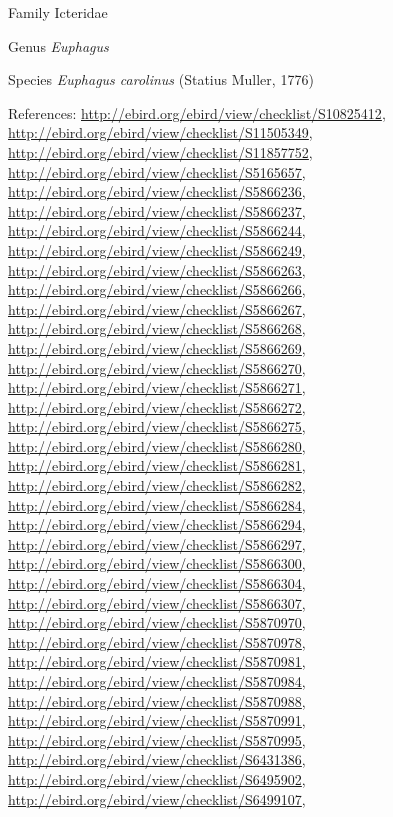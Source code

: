 \documentclass[9pt, article]{memoir}
\begin{document}
\begin{multicols}{2}
\vspace{6pt}\noindent\hspace{24pt}Family Icteridae


\vspace{6pt}\noindent\hspace{30pt}Genus \textit{Euphagus}


\vspace{6pt}\noindent\hspace{36pt}Species \textit{Euphagus carolinus} (Statius Muller, 1776)


\vspace{6pt}References: 
\url{http://ebird.org/ebird/view/checklist/S10825412}, 
\url{http://ebird.org/ebird/view/checklist/S11505349}, 
\url{http://ebird.org/ebird/view/checklist/S11857752}, 
\url{http://ebird.org/ebird/view/checklist/S5165657}, 
\url{http://ebird.org/ebird/view/checklist/S5866236}, 
\url{http://ebird.org/ebird/view/checklist/S5866237}, 
\url{http://ebird.org/ebird/view/checklist/S5866244}, 
\url{http://ebird.org/ebird/view/checklist/S5866249}, 
\url{http://ebird.org/ebird/view/checklist/S5866263}, 
\url{http://ebird.org/ebird/view/checklist/S5866266}, 
\url{http://ebird.org/ebird/view/checklist/S5866267}, 
\url{http://ebird.org/ebird/view/checklist/S5866268}, 
\url{http://ebird.org/ebird/view/checklist/S5866269}, 
\url{http://ebird.org/ebird/view/checklist/S5866270}, 
\url{http://ebird.org/ebird/view/checklist/S5866271}, 
\url{http://ebird.org/ebird/view/checklist/S5866272}, 
\url{http://ebird.org/ebird/view/checklist/S5866275}, 
\url{http://ebird.org/ebird/view/checklist/S5866280}, 
\url{http://ebird.org/ebird/view/checklist/S5866281}, 
\url{http://ebird.org/ebird/view/checklist/S5866282}, 
\url{http://ebird.org/ebird/view/checklist/S5866284}, 
\url{http://ebird.org/ebird/view/checklist/S5866294}, 
\url{http://ebird.org/ebird/view/checklist/S5866297}, 
\url{http://ebird.org/ebird/view/checklist/S5866300}, 
\url{http://ebird.org/ebird/view/checklist/S5866304}, 
\url{http://ebird.org/ebird/view/checklist/S5866307}, 
\url{http://ebird.org/ebird/view/checklist/S5870970}, 
\url{http://ebird.org/ebird/view/checklist/S5870978}, 
\url{http://ebird.org/ebird/view/checklist/S5870981}, 
\url{http://ebird.org/ebird/view/checklist/S5870984}, 
\url{http://ebird.org/ebird/view/checklist/S5870988}, 
\url{http://ebird.org/ebird/view/checklist/S5870991}, 
\url{http://ebird.org/ebird/view/checklist/S5870995}, 
\url{http://ebird.org/ebird/view/checklist/S6431386}, 
\url{http://ebird.org/ebird/view/checklist/S6495902}, 
\url{http://ebird.org/ebird/view/checklist/S6499107}, 

\end{multicols}
\end{document}
